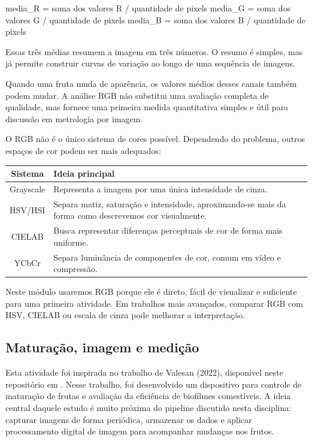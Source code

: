 \documentclass[12pt]{article}
\begin{document}
\begin{codebox}
media_R = soma dos valores R / quantidade de pixels
media_G = soma dos valores G / quantidade de pixels
media_B = soma dos valores B / quantidade de pixels
\end{codebox}

Essas três médias resumem a imagem em três números. O resumo é simples, mas já permite construir curvas de variação ao longo de uma sequência de imagens.

Quando uma fruta muda de aparência, os valores médios desses canais também podem mudar. A análise RGB não substitui uma avaliação completa de qualidade, mas fornece uma primeira medida quantitativa simples e útil para discussão em metrologia por imagem.

O RGB não é o único sistema de cores possível. Dependendo do problema, outros espaços de cor podem ser mais adequados:

\begin{cmdbox}
\begin{tabularx}{\linewidth}{@{}C >{\raggedright\arraybackslash}X@{}}
\toprule
\textbf{Sistema} & \textbf{Ideia principal} \\
\midrule
Grayscale & Representa a imagem por uma única intensidade de cinza. \\
HSV/HSI & Separa matiz, saturação e intensidade, aproximando-se mais da forma como descrevemos cor visualmente. \\
CIELAB & Busca representar diferenças perceptuais de cor de forma mais uniforme. \\
YCbCr & Separa luminância de componentes de cor, comum em vídeo e compressão. \\
\bottomrule
\end{tabularx}
\end{cmdbox}

Neste módulo usaremos RGB porque ele é direto, fácil de visualizar e suficiente para uma primeira atividade. Em trabalhos mais avançados, comparar RGB com HSV, CIELAB ou escala de cinza pode melhorar a interpretação.

\subsection{Maturação, imagem e medição}

Esta atividade foi inspirada no trabalho de Valesan (2022), disponível neste repositório em . Nesse trabalho, foi desenvolvido um dispositivo para controle de maturação de frutas e avaliação da eficiência de biofilmes comestíveis. A ideia central daquele estudo é muito próxima do pipeline discutido nesta disciplina: capturar imagens de forma periódica, armazenar os dados e aplicar processamento digital de imagem para acompanhar mudanças nos frutos.
\end{document}
